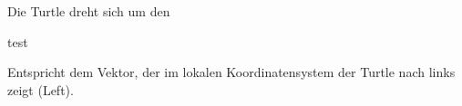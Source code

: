 \cite[S.19]{ABOP:04}



\begin{description}[5cm]
	\item[\boldmath$+(d)$ und $-(d)$]  Die Turtle dreht sich um den \\
	
	\item[\boldmath$/(d)$ und $\backslash(d)$]test \\
	
	\item[\boldmath
	$
	\begin{array}{cc}
	+(d)\\-(d)
	\end{array}
	$] Entspricht dem Vektor, der im lokalen Koordinatensystem der Turtle nach links zeigt (Left).
\end{description}
